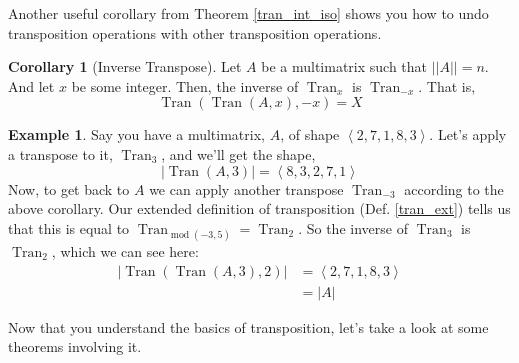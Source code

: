 \documentclass[12pt]{book}
\theoremstyle{plain}
\theoremstyle{definition}
\newtheorem{corollary}{Corollary}[theorem]
\newtheorem{example}{Example}[chapter]
\theoremstyle{ppart}
\theoremstyle{case}
\theoremstyle{solution}
\DeclareMathOperator{\Tran}{Tran}
\DeclareMathOperator{\remainder}{mod}
\newcommand{\shape}[1]{\left|#1\right|}
\begin{document}
Another useful corollary from Theorem \ref{tran_int_iso} shows you how to
undo transposition operations with other transposition operations.

\begin{corollary}[Inverse Transpose]
Let $A$ be a multimatrix such that $\shape{\shape{A}} = n$. And let
$x$ be some integer. Then, the inverse of $\Tran_x$ is
$\Tran_{-x}$. That is,
\[ \Tran(\Tran(A, x), -x) = X \]
\end{corollary}

\begin{example}
Say you have a multimatrix, $A$, of shape $\left<2,7,1,8,3\right>$.
Let's apply a transpose to it, $\Tran_3$, and we'll get the shape,
\[ \shape{\Tran(A, 3)} = \left<8,3,2,7,1\right> \]
Now, to get back to $A$ we can apply another transpose $\Tran_{-3}$ according
to the above corollary.
Our extended definition of transposition (Def. \ref{tran_ext})
tells us that this is equal to $\Tran_{\remainder(-3, 5)} = \Tran_{2}$.
So the inverse of $\Tran_3$ is $\Tran_2$, which we can see here:
\begin{align*}
  \shape{\Tran(\Tran(A, 3), 2)}
  &= \left<2,7,1,8,3\right> \\
  &= \shape{A}
\end{align*}
\end{example}

Now that you understand the basics of transposition, let's take a look
at some theorems involving it.
\end{document}
